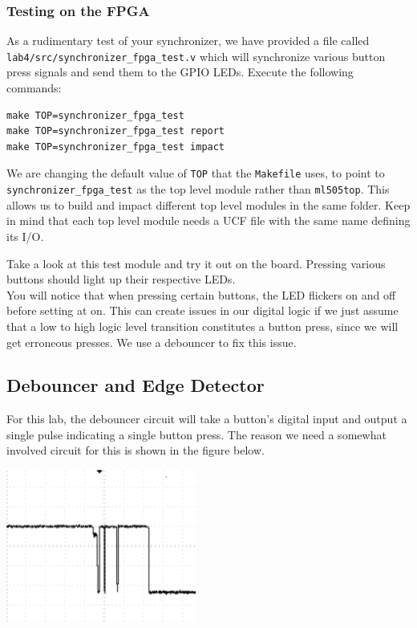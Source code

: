 \documentclass[11pt]{article}
\begin{document}
\subsubsection{Testing on the FPGA}
As a rudimentary test of your synchronizer, we have provided a file called \verb|lab4/src/synchronizer_fpga_test.v| which will synchronize various button press signals and send them to the GPIO LEDs. Execute the following commands:

\begin{verbatim}
make TOP=synchronizer_fpga_test
make TOP=synchronizer_fpga_test report
make TOP=synchronizer_fpga_test impact
\end{verbatim} 

We are changing the default value of \verb|TOP| that the \verb|Makefile| uses, to point to \verb|synchronizer_fpga_test| as the top level module rather than \verb|ml505top|. This allows us to build and impact different top level modules in the same folder. Keep in mind that each top level module needs a UCF file with the same name defining its I/O.

Take a look at this test module and try it out on the board. Pressing various buttons should light up their respective LEDs. \\

You will notice that when pressing certain buttons, the LED flickers on and off before setting at on. This can create issues in our digital logic if we just assume that a low to high logic level transition constitutes a button press, since we will get erroneous presses. We use a debouncer to fix this issue.

\subsection{Debouncer and Edge Detector}

For this lab, the debouncer circuit will take a button's digital input and output a single pulse indicating a single button press. The reason we need a somewhat involved circuit for this is shown in the figure below.

\begin{center}
\includegraphics[height=5cm]{images/lab2_fig4.png}
\end{center}
\end{document}

